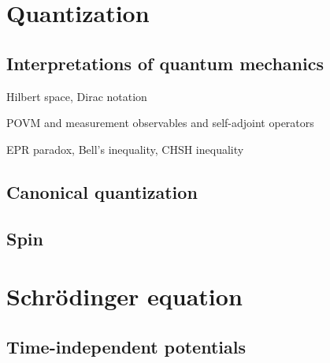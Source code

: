 \documentclass{../../large}
\begin{document}
\chapter{Quantization}

\section{Interpretations of quantum mechanics}
\begin{prb}
Hilbert space, Dirac notation
\end{prb}
\begin{prb}[Pictures]
\end{prb}
\begin{prb}
POVM and measurement
observables and self-adjoint operators
\end{prb}
\begin{prb}
EPR paradox, Bell's inequality, CHSH inequality
\end{prb}

\section{Canonical quantization}
\begin{prb}
\end{prb}
\begin{prb}
\end{prb}
\begin{prb}
\end{prb}

\section{Spin}
\begin{prb}
\end{prb}





\chapter{Schr\"odinger equation}

\section{Time-independent potentials}
\begin{prb}
\end{prb}
\begin{prb}
\end{prb}
\begin{prb}
\end{prb}
\begin{prb}
\end{prb}
\end{document}
